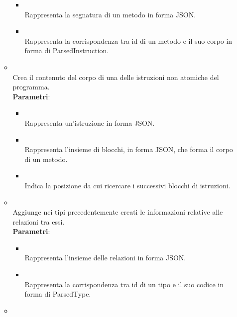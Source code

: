 \begin{itemize}
\begin{itemize}
\begin{itemize}
\item {}
\\ Rappresenta la segnatura di un metodo in forma JSON.
\item {}
\\ Rappresenta la corrispondenza tra id di un metodo e il suo corpo in forma di ParsedInstruction.
\end{itemize}
\item {}
\\ Crea il contenuto del corpo di una delle istruzioni non atomiche del programma.
\\ \textbf{Parametri}:
\begin{itemize}
\item {}
\\ Rappresenta un'istruzione in forma JSON.
\item {}
\\ Rappresenta l'insieme di blocchi, in forma JSON, che forma il corpo di un metodo.
\item {}
\\ Indica la posizione da cui ricercare i successivi blocchi di istruzioni.
\end{itemize}
\item {}
\\ Aggiunge nei tipi precedentemente creati le informazioni relative alle relazioni tra essi.
\\ \textbf{Parametri}:
\begin{itemize}
\item {}
\\ Rappresenta l'insieme delle relazioni in forma JSON.
\item {}
\\ Rappresenta la corrispondenza tra id di un tipo e il suo codice in forma di ParsedType.
\end{itemize}
\item {}

\end{itemize}
\end{itemize}

